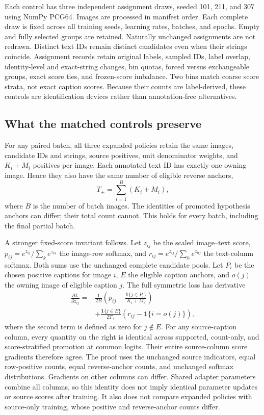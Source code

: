 Each control has three independent assignment draws, seeded 101, 211, and 307 using NumPy PCG64. Images are processed in manifest order. Each complete draw is fixed across all training seeds, learning rates, batches, and epochs. Empty and fully selected groups are retained. Naturally unchanged assignments are not redrawn. Distinct text IDs remain distinct candidates even when their strings coincide. Assignment records retain original labels, sampled IDs, label overlap, identity-level and exact-string changes, bin quotas, forced versus exchangeable groups, exact score ties, and frozen-score imbalance. Two bins match coarse score strata, not exact caption scores. Because their counts are label-derived, these controls are identification devices rather than annotation-free alternatives.

\subsection{What the matched controls preserve}
\label{app:followupinvariants}
For any paired batch, all three expanded policies retain the same images, candidate IDs and strings, source positives, unit denominator weights, and $K_i+M_i$ positives per image. Each annotated text ID has exactly one owning image. Hence they also have the same number of eligible reverse anchors,
\begin{equation}
T_+=\sum_{i=1}^{B}(K_i+M_i),
\end{equation}
where $B$ is the number of batch images. The identities of promoted hypothesis anchors can differ; their total count cannot. This holds for every batch, including the final partial batch.

A stronger fixed-score invariant follows. Let $z_{ij}$ be the scaled image--text score, $p_{ij}=e^{z_{ij}}/\sum_k e^{z_{ik}}$ the image-row softmax, and $r_{ij}=e^{z_{ij}}/\sum_h e^{z_{hj}}$ the text-column softmax. Both sums use the unchanged complete candidate pools. Let $P_i$ be the chosen positive captions for image $i$, $E$ the eligible caption anchors, and $o(j)$ the owning image of eligible caption $j$. The full symmetric loss has derivative
\begin{align}
\frac{\partial L}{\partial z_{ij}}
={}&\frac{1}{2B}\left(p_{ij}-\frac{\mathbf1\{j\in P_i\}}{K_i+M_i}\right)\nonumber\\
&+\frac{\mathbf1\{j\in E\}}{2T_+}
\left(r_{ij}-\mathbf1\{i=o(j)\}\right),
\label{eq:followupgradient}
\end{align}
where the second term is defined as zero for $j\notin E$. For any source-caption column, every quantity on the right is identical across supported, count-only, and score-stratified promotion at common logits. Their entire source-column score gradients therefore agree. The proof uses the unchanged source indicators, equal row-positive counts, equal reverse-anchor counts, and unchanged softmax distributions. Gradients on other columns can differ. Shared adapter parameters combine all columns, so this identity does not imply identical parameter updates or source scores after training. It also does not compare expanded policies with source-only training, whose positive and reverse-anchor counts differ.

